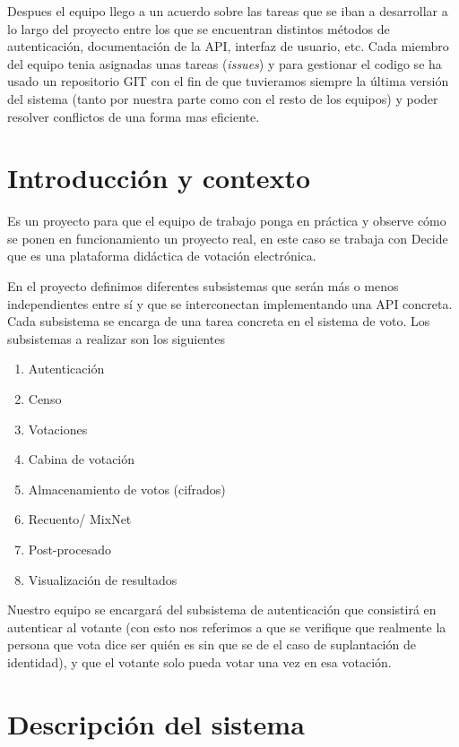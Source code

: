 \documentclass[12pt]{article}
\begin{document}
Despues el equipo llego a un acuerdo sobre las tareas que se iban a desarrollar a lo largo del proyecto entre los que se encuentran distintos métodos de autenticación, documentación de la API, interfaz de usuario, etc. Cada miembro del equipo tenia asignadas unas tareas (\emph{issues}) y para gestionar el codigo se ha usado un repositorio GIT con el fin de que tuvieramos siempre la última versión del sistema (tanto por nuestra parte como con el resto de los equipos) y poder resolver conflictos de una forma mas eficiente.



\newpage	
\section{Introducción y contexto}

Es un proyecto para que el equipo de trabajo ponga en práctica y observe cómo se ponen en funcionamiento un proyecto real, en este caso se trabaja con Decide que es una plataforma didáctica de votación electrónica.

En el proyecto definimos diferentes subsistemas que serán más o menos independientes entre sí y que se interconectan implementando una API concreta.
Cada subsistema se encarga de una tarea concreta en el sistema de voto. Los subsistemas a realizar son los siguientes \cite{decide-subsistemas}

 \begin{enumerate}
    \item Autenticación
    \item Censo
    \item Votaciones
    \item Cabina de votación
    \item Almacenamiento de votos (cifrados)
    \item Recuento/ MixNet
    \item Post-procesado
    \item Visualización de resultados
 \end{enumerate}

Nuestro equipo se encargará del subsistema de autenticación que consistirá en autenticar al votante (con esto nos referimos a que se verifique que realmente la persona que vota dice ser quién es sin que se de el caso de suplantación de identidad), y que el votante solo pueda votar una vez en esa votación.


\section{Descripción del sistema}
\end{document}
